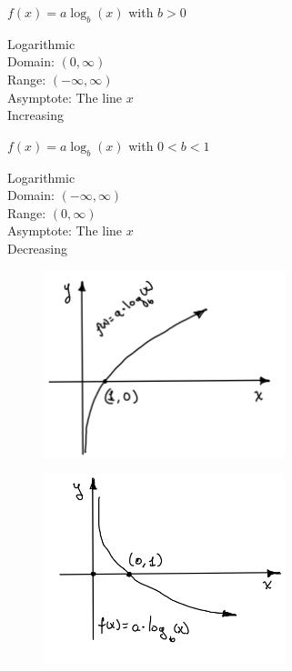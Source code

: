\begin{multicols}{2}

    \hline
    \begin{center}
        $f(x) = a \log_b (x)$ with $b > 0$

        Logarithmic\\
        Domain: $(0, \infty)$\\
        Range: $(- \infty, \infty)$\\
        Asymptote: The line $x$ \\
        Increasing
        \vspace{5mm}
    \end{center}
    \hline
    \begin{center}
        $f(x) = a \log_b (x)$ with $0 < b < 1$

        Logarithmic\\
        Domain: $(-\infty, \infty)$\\
        Range: $(0, \infty)$\\
        Asymptote: The line $x$\\
        Decreasing
        \vspace{10mm}
    \end{center}
    \hline
    \begin{figure}[H]
        \centering
        \includegraphics[width=7cm]{images/fig7}
    \end{figure}
    \begin{figure}[H]
        \centering
        \includegraphics[width=7cm]{images/fig8}
    \end{figure}
    \vspace{4mm}
    \begin{center}
        \hline


\end{center}
\end{multicols}

